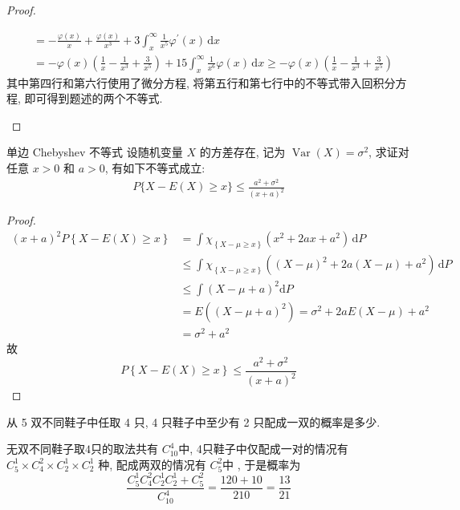 \documentclass[../main.tex]{subfiles}
\begin{document}
\begin{proof}
\begin{enumerate}
\[\begin{aligned}
             &= -\frac{ \varphi \left( x \right)  }{x }+ \frac{ \varphi \left( x \right)  }{x^{3} }+ 3\int_{x}^{\infty}\frac{1 }{x^{5} } \varphi ^{\prime} \left( x \right)\,\mathrm{d} x\\ 
              &= - \varphi \left( x \right)     \left( \frac{1 }{x }-\frac{1 }{x^{3} }+ \frac{3 }{x^{5} }    \right) + 15\int_{x}^{\infty}\frac{1 }{x^{6} } \varphi \left( x \right)\,\mathrm{d} x\ge - \varphi \left( x \right)\left( \frac{1 }{x }-\frac{1 }{x^{3} }+ \frac{3 }{x^{5} }    \right)    
        \end{aligned}
        \]其中第四行和第六行使用了微分方程, 将第五行和第七行中的不等式带入回积分方程, 即可得到题述的两个不等式.
    \end{enumerate}
    
\end{proof}
\begin{exercise}{单边 Chebyshev 不等式}{}
设随机变量 $X$ 的方差存在, 记为 $\operatorname{Var}(X) = \sigma^2$, 求证对任意 $x > 0$ 和 $a > 0$, 有如下不等式成立:
$$\begin{aligned}
P\{X - E(X) \ge x\} \le \frac{a^2 + \sigma^2}{(x+a)^2}
\end{aligned}$$
\end{exercise}
\begin{proof}
      \[
 \begin{aligned}
 \left( x+ a \right)^{2}  P\left\{ X-E\left( X \right)\ge x  \right\}&=  \int \chi _{\left\{ X-\mu \ge x \right\}}\left( x^{2}+ 2ax+ a^{2} \right)   \,\mathrm{d} P\\ 
  &\le  \int \chi _{\left\{ X-\mu \ge x \right\}}\left( \left( X-\mu  \right)^{2}+ 2a\left( X-\mu  \right)+ a^{2}   \right) \,\mathrm{d} P \\ 
   &\le  \int \left( X-\mu + a \right)^{2}\mathrm{d} P\\ 
    &= E\left( \left( X-\mu  + a\right)^{2}  \right)=  \sigma ^{2}+2aE\left( X-\mu  \right)+ a^{2} \\ 
     &=  \sigma ^{2}+ a^{2}
 \end{aligned}
      \]故 \[
      P\left\{ X-E\left( X \right)\ge x  \right\}\le \frac{a^{2}+  \sigma ^{2} }{\left( x+ a \right)^{2}  } 
      \]
\end{proof}
\begin{exercise}{}{}
从 5 双不同鞋子中任取 4 只, 4 只鞋子中至少有 2 只配成一双的概率是多少.
\end{exercise}
\begin{solution}
   无双不同鞋子取\(  4  \)只的取法共有 \(  C_{10}^{4}  \)中, 4只鞋子中仅配成一对的情况有 \( C_{5}^{1}\times C_{4}^{2}\times C_{2}^{1}\times C_{2}^{1}   \) 种, 配成两双的情况有 \(  C_{5}^{2}  \)中 , 于是概率为   \[
    \frac{ C_{5}^{1}C_{4}^{2}C_{2}^{1}C_{2}^{1}+ C_{5}^{2}}{C_{10}^{4} } = \frac{120+ 10 }{210 }= \frac{13 }{21 }  
    \] 
\end{solution}
\end{document}
